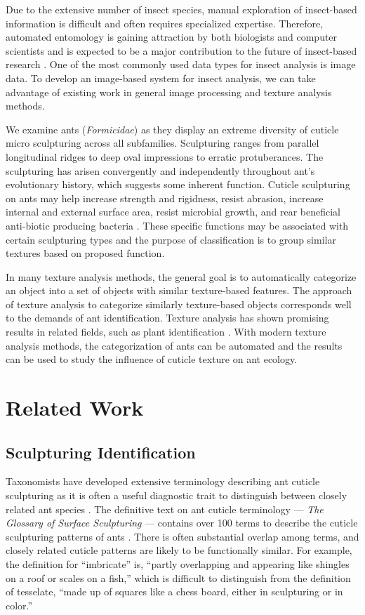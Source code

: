 \documentclass{aci}
\numberwithin{equation}{section}
\begin{document}
Due to the extensive number of insect species, manual exploration of
insect-based information is difficult and often requires specialized expertise.
Therefore, automated entomology is gaining attraction by both biologists and
computer scientists and is expected to be a major contribution to the future of
insect-based research \cite{martineau_survey_2017}. One of the most commonly
used data types for insect analysis is image data. To develop an image-based
system for insect analysis, we can take advantage of existing work in general
image processing and texture analysis methods.

We examine ants (\textit{Formicidae}) as they display an extreme diversity of
cuticle micro sculpturing across all subfamilies. Sculpturing ranges from
parallel longitudinal ridges to deep oval impressions to erratic protuberances.
The sculpturing has arisen convergently and independently throughout ant's
evolutionary history, which suggests some inherent function. Cuticle sculpturing
on ants may help increase strength and rigidness, resist abrasion, increase
internal and external surface area, resist microbial growth, and rear beneficial
anti-biotic producing bacteria \cite{johnson_effect_2011,
    bruckner_relationship_2017, currie_coevolved_2006}. These specific functions may
be associated with certain sculpturing types and the purpose of classification
is to group similar textures based on proposed function.

In many texture analysis methods, the general goal is to automatically
categorize an object into a set of objects with similar texture-based features.
The approach of texture analysis to categorize similarly texture-based objects
corresponds well to the demands of ant identification. Texture analysis has
shown promising results in related fields, such as plant identification
\cite{boudra_plant_2018}. With modern texture analysis methods, the
categorization of ants can be automated and the results can be used to study the
influence of cuticle texture on ant ecology.

\section{Related Work}
\subsection{Sculpturing Identification}
Taxonomists have developed extensive terminology describing ant cuticle
sculpturing as it is often a useful diagnostic trait to distinguish between
closely related ant species \cite{blaimer_taxonomy_2019,fisher_ants_2007}. The
definitive text on ant cuticle terminology — \textit{The Glossary of Surface
    Sculpturing} — contains over 100 terms to describe the cuticle sculpturing
patterns of ants \cite{harris_glossary_1979}. There is often substantial overlap
among terms, and closely related cuticle patterns are likely to be functionally
similar. For example, the definition for “imbricate” is, “partly overlapping and
appearing like shingles on a roof or scales on a fish,” which is difficult to
distinguish from the definition of tesselate, “made up of squares like a chess
board, either in sculpturing or in color.”
\end{document}
